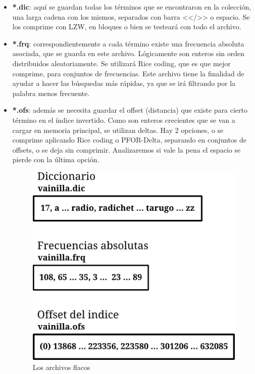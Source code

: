 \begin{itemize}

\item \textbf{*.dic}: aquí se guardan todas los términos que se encontraron en la colección, una larga cadena con los mismos, separados con barra <</>> o espacio. Se los comprime con LZW, en bloques o bien se testeará con todo el archivo. 

\item \textbf{*.frq}: correspondientemente a cada término existe una frecuencia absoluta asociada, que se guarda en este archivo. Lógicamente son enteros sin orden distribuidos aleatoriamente. Se utilizará Rice coding, que es que mejor comprime, para conjuntos de frecuencias. Este archivo tiene la finalidad de ayudar a hacer las búsquedas más rápidas, ya que se irá filtrando por la palabra menos frecuente.

\item \textbf{*.ofs}: además se necesita guardar el offset (distancia) que existe para cierto término en el índice invertido. Como son enteros crecientes que se van a cargar en memoria principal, se utilizan deltas. Hay 2 opciones, o se comprime aplicando Rice coding o PFOR-Delta, separando en conjuntos de offsets, o se deja sin comprimir. Analizaremos si vale la pena el espacio se pierde con la última opción.


\begin{figure}[!h]
\centering
    \includegraphics[scale=0.9]{./Images/estructura_2.png}
\caption{Los archivos flacos}
\label{fig:flacos}
\end{figure}



\end{itemize}

